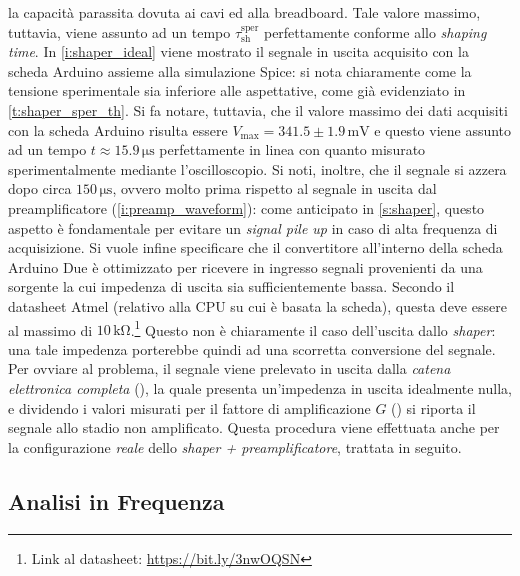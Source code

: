 \documentclass[a4paper,11pt]{article} %
\begin{document}
la capacità parassita dovuta ai cavi ed alla breadboard. Tale valore massimo, tuttavia, viene assunto ad un tempo
$\tau_{\text{sh}}^{\text{sper}}$ perfettamente conforme allo \textit{shaping time}. In \autoref{i:shaper_ideal} viene
mostrato il segnale in uscita acquisito con la scheda Arduino assieme alla simulazione Spice: si nota chiaramente come
la tensione sperimentale sia inferiore alle aspettative, come già evidenziato in \autoref{t:shaper_sper_th}. Si fa
notare, tuttavia, che il valore massimo dei dati acquisiti con la scheda Arduino risulta essere $V_{\text{max}} = 341.5
\pm 1.9 \,\si{\milli\volt}$ e questo viene assunto ad un tempo $t \approx 15.9\,\si{\us}$ perfettamente in linea con
quanto misurato sperimentalmente mediante l'oscilloscopio. Si noti, inoltre, che il segnale si azzera dopo circa
$150\,\si{\us}$, ovvero molto prima rispetto al segnale in uscita dal preamplificatore (\autoref{i:preamp_waveform}):
come anticipato in \autoref{s:shaper}, questo aspetto è fondamentale per evitare un \textit{signal pile up} in caso di
alta frequenza di acquisizione. Si vuole infine specificare che il convertitore all'interno della scheda Arduino Due è
ottimizzato per ricevere in ingresso segnali provenienti da una sorgente la cui impedenza di uscita sia sufficientemente
bassa. Secondo il datasheet Atmel (relativo alla CPU su cui è basata la scheda), questa deve essere al massimo di
$10\,\si{\kilo\ohm}$.\footnote{Link al datasheet: \url{https://bit.ly/3nwOQSN}} Questo non è chiaramente il caso dell'uscita dallo
\textit{shaper}: una tale impedenza porterebbe quindi ad una scorretta conversione del segnale. Per ovviare al problema,
il segnale viene prelevato in uscita dalla \textit{catena elettronica completa} (), la quale presenta un'impedenza in
uscita idealmente nulla, e dividendo i valori misurati per il fattore di amplificazione $G$ () si riporta il segnale
allo stadio non amplificato. Questa procedura viene effettuata anche per la configurazione \textit{reale} dello
\textit{shaper + preamplificatore}, trattata in seguito.




\subsection{Analisi in Frequenza}\label{s:shaper_bode}
\end{document}
